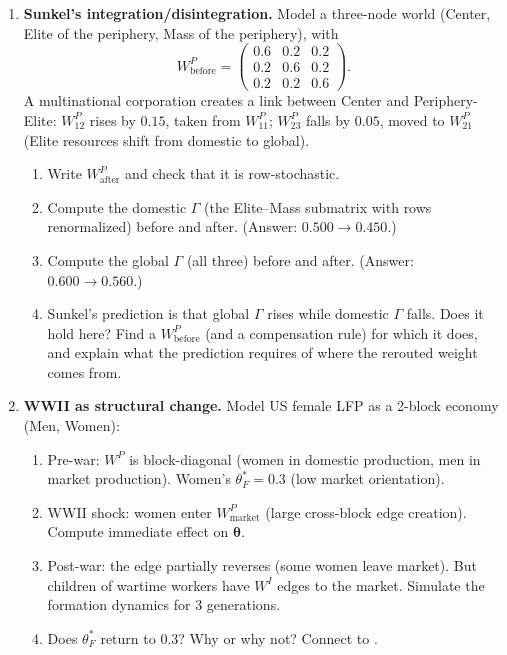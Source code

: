 \documentclass[../structural_economics_book.tex]{subfiles}
\begin{document}
\begin{enumerate}[label=\textbf{13.\arabic*}, leftmargin=3em]
\item \textbf{Sunkel's integration/disintegration.}\label{ch13:ex:sunkel} Model a three-node world (Center, Elite of the periphery, Mass of the periphery), with
\[
W^P_{\text{before}} = \begin{pmatrix} 0.6 & 0.2 & 0.2 \\ 0.2 & 0.6 & 0.2 \\ 0.2 & 0.2 & 0.6 \end{pmatrix}.
\]
A multinational corporation creates a link between Center and Periphery-Elite: $W^P_{12}$ rises by $0.15$, taken from $W^P_{11}$; $W^P_{23}$ falls by $0.05$, moved to $W^P_{21}$ (Elite resources shift from domestic to global).
\begin{enumerate}
\item Write $W^P_{\text{after}}$ and check that it is row-stochastic.
\item Compute the domestic $\Gamma$ (the Elite--Mass submatrix with rows renormalized) before and after. (Answer: $0.500 \to 0.450$.)
\item Compute the global $\Gamma$ (all three) before and after. (Answer: $0.600 \to 0.560$.)
\item Sunkel's prediction is that global $\Gamma$ rises while domestic $\Gamma$ falls. Does it hold here? Find a $W^P_{\text{before}}$ (and a compensation rule) for which it does, and explain what the prediction requires of where the rerouted weight comes from.
\end{enumerate}

\item \textbf{WWII as structural change.} Model US female LFP as a 2-block economy (Men, Women):
\begin{enumerate}
\item Pre-war: $W^P$ is block-diagonal (women in domestic production, men in market production). Women's $\theta^*_F = 0.3$ (low market orientation).
\item WWII shock: women enter $W^P_{\text{market}}$ (large cross-block edge creation). Compute immediate effect on $\boldsymbol{\theta}$.
\item Post-war: the edge partially reverses (some women leave market). But children of wartime workers have $W^I$ edges to the market. Simulate the formation dynamics for 3 generations.
\item Does $\theta^*_F$ return to 0.3? Why or why not? Connect to \citet{fernandez2013cultural}.
\end{enumerate}


\end{enumerate}
\end{document}
